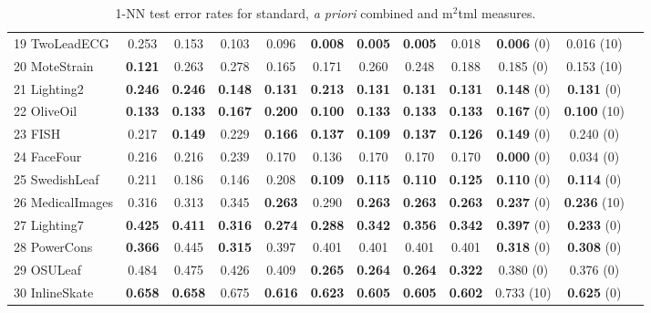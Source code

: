 \begin{table}[h!]
{\begin{tabular}{|l|ccccc|ccc|ccc|}
			19 TwoLeadECG          & 0.253 & 0.153 & 0.103 & 0.096 & \textbf{0.008}   & \textbf{0.005} & \textbf{0.005} & 0.018 & \textbf{0.006} (0)  & 0.016 (10) & \checkmark \\
			20 MoteStrain          & \textbf{0.121} & 0.263& 0.278 & 0.165& 0.171     & 0.260 & 0.248 & 0.188 & 0.185 (0)  & 0.153 (10) & \checkmark \\						
			21 Lighting2           & \textbf{0.246} & \textbf{0.246} & \textbf{0.148} & \textbf{0.131} & \textbf{0.213} & \textbf{0.131} & \textbf{0.131} & \textbf{0.131} & \textbf{0.148} (0)  & \textbf{0.131} (0) & \checkmark \\
			22 OliveOil            & \textbf{0.133} & \textbf{0.133} & \textbf{0.167} & \textbf{0.200} & \textbf{0.100}    & \textbf{0.133} & \textbf{0.133} & \textbf{0.133} & \textbf{0.167} (0)  & \textbf{0.100} (10) & \checkmark \\			
			23 FISH                & 0.217 & \textbf{0.149} & 0.229 & \textbf{0.166} & \textbf{0.137}   & \textbf{0.109} & \textbf{0.137} & \textbf{0.126} & \textbf{0.149} (0)  & 0.240 (0) & \checkmark  \\			
			24 FaceFour            & 0.216 & 0.216 & 0.239 & 0.170 & 0.136 & 0.170 & 0.170 & 0.170 & \textbf{0.000} (0)     & 0.034 (0)  & \checkmark \\
			25 SwedishLeaf         & 0.211 & 0.186 & 0.146 & 0.208 & \textbf{0.109} & \textbf{0.115} & \textbf{0.110} & \textbf{0.125} & \textbf{0.110} (0) & \textbf{0.114} (0) & \checkmark \\			
			26 MedicalImages       & 0.316 & 0.313 & 0.345 & \textbf{0.263} & 0.290     & \textbf{0.263} & \textbf{0.263} & \textbf{0.263} & \textbf{0.237} (0) & \textbf{0.236} (10) & \checkmark \\
			27 Lighting7           & \textbf{0.425} & \textbf{0.411} & \textbf{0.316} & \textbf{0.274} & \textbf{0.288}     & \textbf{0.342} & \textbf{0.356} & \textbf{0.342} & \textbf{0.397} (0)  & \textbf{0.233} (0) & \checkmark \\
			28 PowerCons           & \textbf{0.366} & 0.445 & \textbf{0.315} & 0.397 & 0.401     & 0.401 & 0.401 & 0.401 & \textbf{0.318} (0)  & \textbf{0.308} (0) & \checkmark \\												
			29 OSULeaf             & 0.484 & 0.475 & 0.426 & 0.409 & \textbf{0.265}    & \textbf{0.264} & \textbf{0.264} & \textbf{0.322} & 0.380 (0)  & 0.376 (0)  & \checkmark \\
			30 InlineSkate         & \textbf{0.658} & \textbf{0.658} & 0.675 & \textbf{0.616} & \textbf{0.623}     & \textbf{0.605} & \textbf{0.605} & \textbf{0.602} & 0.733  (10) & \textbf{0.625} (0) & \checkmark \\
			\hline
		\end{tabular}
	}
	\caption{1-NN test error rates for standard, \textit{a priori} combined and {\sc m}$^2${\sc tml} measures.}
	\label{tab-resu}
\end{table}



